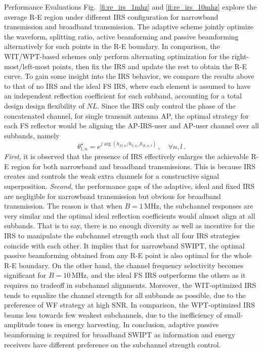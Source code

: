 \documentclass[journal]{IEEEtran}
\begin{document}
\begin{section}{Performance Evaluations}
		Fig.~\ref{fi:re_irs_1mhz} and \ref{fi:re_irs_10mhz} explore the average R-E region under different IRS configuration for narrowband transmission and broadband transmission. The adaptive scheme jointly optimize the waveform, splitting ratio, active beamforming and passive beamforming alternatively for each points in the R-E boundary. In comparison, the WIT/WPT-based schemes only perform alternating optimization for the right-most/left-most points, then fix the IRS and update the rest to obtain the R-E curve. To gain some insight into the IRS behavior, we compare the results above to that of no IRS and the ideal FS IRS, where each element is assumed to have an independent reflection coefficient for each subband, accounting for a total design design flexibility of $NL$. Since the IRS only control the phase of the concatenated channel, for single transmit antenna AP, the optimal strategy for each FS reflector would be aligning the AP-IRS-user and AP-user channel over all subbands, namely
		\begin{equation}
			\theta_{l,n}^{\star}=e^{j\arg{\left(h_{D,n}/h_{I,n,l}h_{R,n,l}\right)}}\,,\quad \forall n,l\,.
		\end{equation}
		\textit{First}, it is observed that the presence of IRS effectively enlarges the achievable R-E region for both narrowband and broadband transmissions. This is because IRS creates and controls the weak extra channels for a constructive signal superposition. \textit{Second}, the performance gaps of the adaptive, ideal and fixed IRS are negligible for narrowband transmission but obvious for broadband transmission. The reason is that when $B=1\,\si{\MHz}$, the subchannel responses are very similar and the optimal ideal reflection coefficients would almost align at all subbands. That is to say, there is no enough diversity as well as incentive for the IRS to manipulate the subchannel strength such that all four IRS strategies coincide with each other. It implies that for narrowband SWIPT, the optimal passive beamforming obtained from any R-E point is also optimal for the whole R-E boundary. On the other hand, the channel frequency selectivity becomes significant for $B=10\,\si{\MHz}$, and the ideal FS IRS outperforms the others as it requires no tradeoff in subchannel alignments. Moreover, the WIT-optimized IRS tends to equalize the channel strength for all subbands as possible, due to the preference of WF strategy at high SNR. In comparison, the WPT-optimized IRS beams less towards few weakest subchannels, due to the inefficiency of small-amplitude tones in energy harvesting. In conclusion, adaptive passive beamforming is required for broadband SWIPT as information and energy receivers have different preference on the subchannel strength control.
	\end{section}
\end{document}

